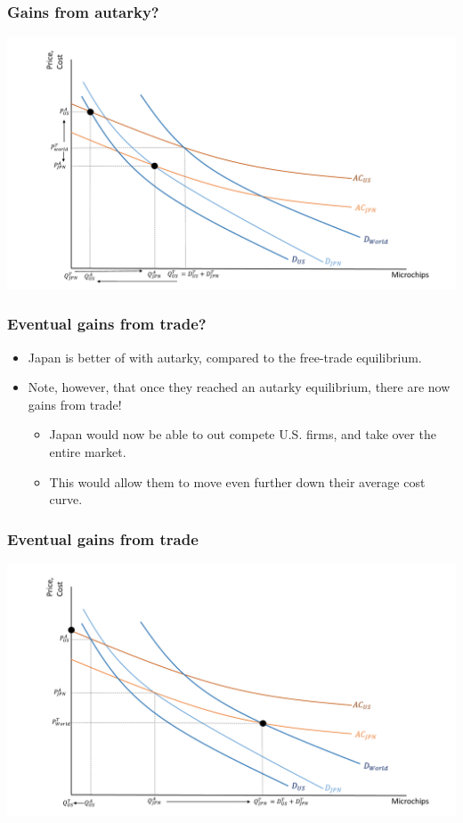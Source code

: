 \documentclass{beamer}
\begin{document}
\begin{frame}
	\frametitle{Gains from autarky?}
	\includegraphics[scale=0.32]{SL4_25.pdf}
\end{frame}

\begin{frame}
	\frametitle{Eventual gains from trade?}
\begin{itemize}
	\item Japan is better of with autarky, compared to the free-trade equilibrium. 
	\item Note, however, that once they reached an autarky equilibrium, there are now gains from trade!
		\begin{itemize}
			\item Japan would now be able to out compete U.S. firms, and take over the entire market.	
			\item This would allow them to move even further down their average cost curve. 
		\end{itemize}
\end{itemize}
\end{frame}

\begin{frame}
	\frametitle{Eventual gains from trade}
	\includegraphics[scale=0.32]{SL4_26.pdf}
\end{frame}
\end{document}
